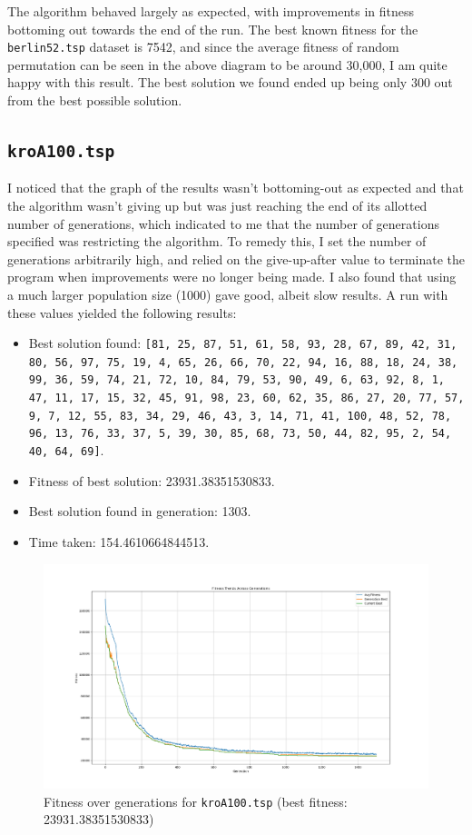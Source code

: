 \documentclass[a4paper]{article}
\begin{document}
The algorithm behaved largely as expected, with improvements in fitness bottoming out towards the end of the run.
The best known fitness for the \texttt{berlin52.tsp} dataset is 7542, and since the average fitness of random permutation can be seen in the above diagram to be around 30,000, I am quite happy with this result.
The best solution we found ended up being only 300 out from the best possible solution.

\subsection{\texttt{kroA100.tsp}}
I noticed that the graph of the results wasn't bottoming-out as expected and that the algorithm wasn't giving up but was just reaching the end of its allotted number of generations, which indicated to me that the number of generations specified was restricting the algorithm.
To remedy this, I set the number of generations arbitrarily high, and relied on the give-up-after value to terminate the program when improvements were no longer being made.
I also found that using a much larger population size (1000) gave good, albeit slow results.
A run with these values yielded the following results:
\begin{itemize}
    \item   Best solution found: \texttt{[81, 25, 87, 51, 61, 58, 93, 28, 67, 89, 42, 31, 80, 56, 97, 75, 19, 4, 65, 26, 66, 70, 22, 94, 16, 88, 18, 24, 38, 99, 36, 59, 74, 21, 72, 10, 84, 79, 53, 90, 49, 6, 63, 92, 8, 1, 47, 11, 17, 15, 32, 45, 91, 98, 23, 60, 62, 35, 86, 27, 20, 77, 57, 9, 7, 12, 55, 83, 34, 29, 46, 43, 3, 14, 71, 41, 100, 48, 52, 78, 96, 13, 76, 33, 37, 5, 39, 30, 85, 68, 73, 50, 44, 82, 95, 2, 54, 40, 64, 69]}.
    \item   Fitness of best solution: 23931.38351530833.
    \item   Best solution found in generation: 1303.
    \item   Time taken: 154.4610664844513.
\end{itemize}

\begin{figure}[H]
    \centering
    \includegraphics[width=\textwidth]{./images/betterkroaplot.png}
    \caption{Fitness over generations for \texttt{kroA100.tsp} (best fitness: 23931.38351530833)}
\end{figure}
\end{document}
